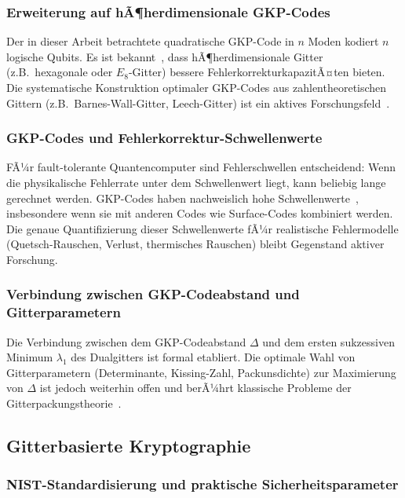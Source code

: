 ﻿\documentclass[a4paper,12pt]{article}
\theoremstyle{definition}
\begin{document}
\subsubsection{Erweiterung auf hÃ¶herdimensionale GKP-Codes}

Der in dieser Arbeit betrachtete quadratische GKP-Code in $n$ Moden kodiert $n$ logische Qubits.
Es ist bekannt~\cite{Harrington2001}, dass hÃ¶herdimensionale Gitter (z.B.\ hexagonale oder
$E_8$-Gitter) bessere FehlerkorrekturkapazitÃ¤ten bieten.
Die systematische Konstruktion optimaler GKP-Codes aus zahlentheoretischen Gittern
(z.B.\ Barnes-Wall-Gitter, Leech-Gitter) ist ein aktives Forschungsfeld~\cite{Royer2022}.

\subsubsection{GKP-Codes und Fehlerkorrektur-Schwellenwerte}

FÃ¼r fault-tolerante Quantencomputer sind Fehlerschwellen entscheidend:
Wenn die physikalische Fehlerrate unter dem Schwellenwert liegt, kann beliebig
lange gerechnet werden.
GKP-Codes haben nachweislich hohe Schwellenwerte~\cite{Menicucci2014},
insbesondere wenn sie mit anderen Codes wie Surface-Codes kombiniert werden.
Die genaue Quantifizierung dieser Schwellenwerte fÃ¼r realistische Fehlermodelle
(Quetsch-Rauschen, Verlust, thermisches Rauschen) bleibt Gegenstand aktiver Forschung.

\subsubsection{Verbindung zwischen GKP-Codeabstand und Gitterparametern}

Die Verbindung zwischen dem GKP-Codeabstand $\Delta$ und dem ersten sukzessiven Minimum
$\lambda_1$ des Dualgitters ist formal etabliert.
Die optimale Wahl von Gitterparametern (Determinante, Kissing-Zahl, Packunsdichte)
zur Maximierung von $\Delta$ ist jedoch weiterhin offen und berÃ¼hrt klassische Probleme
der Gitterpackungstheorie~\cite{ConwaySloane1993}.

\subsection{Gitterbasierte Kryptographie}

\subsubsection{NIST-Standardisierung und praktische Sicherheitsparameter}
\end{document}
